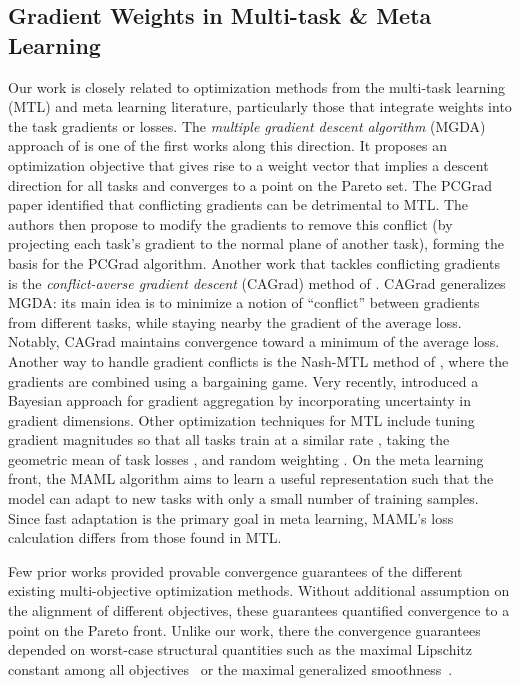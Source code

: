 \subsection{Gradient Weights in Multi-task \& Meta Learning}
Our work is closely related to optimization methods from the multi-task learning (MTL) and meta learning literature, particularly those that integrate weights into the task gradients or losses. The \emph{multiple gradient descent algorithm} (MGDA) approach of \citet{desideri2012multiple, sener2018multi,zhang2024convergence} is one of the first works along this direction. It proposes an optimization objective that gives rise to a weight vector that implies a descent direction for all tasks and converges to a point on the Pareto set. 
The PCGrad paper \cite{yu2020gradient} identified that conflicting gradients can be detrimental to MTL. The authors then propose to modify the gradients to remove this conflict (by projecting each task's gradient to the normal plane of another task), forming the basis for the PCGrad algorithm. Another work that tackles conflicting gradients is the \emph{conflict-averse gradient descent} (CAGrad) method of \cite{liu2021conflict}. CAGrad generalizes MGDA: its main idea is to minimize a notion of ``conflict'' between gradients from different tasks, while staying nearby the gradient of the average loss. Notably, CAGrad maintains convergence toward a minimum of the average loss. Another way to handle gradient conflicts is the Nash-MTL method of \citet{navon2022multi}, where the gradients are combined using a bargaining game. Very recently, \citet{achituve2024bayesian} introduced a Bayesian approach for gradient aggregation by incorporating uncertainty in gradient dimensions. Other optimization techniques for MTL include tuning gradient magnitudes so that all tasks train at a similar rate \citep{chen2018gradnorm}, taking the geometric mean of task losses \citep{chennupati2019multinet++}, and random weighting \citep{lin2021reasonable}. On the meta learning front, the MAML algorithm \citep{finn2019online} aims to learn a useful representation such that the model can adapt to new tasks with only a small number of training samples. Since fast adaptation is the primary goal in meta learning, MAML's loss calculation differs from those found in MTL. 

Few prior works provided provable convergence guarantees of the different existing multi-objective optimization methods. Without additional assumption on the alignment of different objectives, these guarantees quantified convergence to a point on the Pareto front. Unlike our work, there the convergence guarantees depended on worst-case structural quantities such as the maximal Lipschitz constant among all objectives~\cite{liu2021conflict,navon2022multi} or the maximal generalized smoothness~\cite{zhang2024convergence}.


